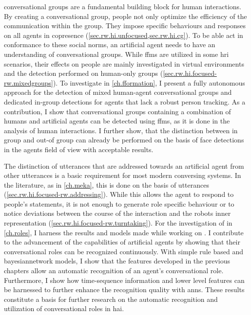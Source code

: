 \Glspl{conversational group} are a fundamental building block for human interactions.
By creating a \gls{conversational group}, people not only optimize the efficiency of the communication within the group.
They impose specific behaviours and responses on all agents in \gls{copresence} (\cref{sec.rw.hi.unfocused,sec.rw.hi.cg}).
To be able act in conformance to these social norms, an \gls{artificial agent} needs to have an understanding of \glspl{conversational group}.
While \glspl{ffm} are utilized in some \gls{hri} scenarios, their effects on people are mainly investigated in virtual environments and the detection performed on human-only groups (\cref{sec.rw.hi.focused-rw.mixedgroups}).
To investigate  in \cref{ch.fformation}, I present a fully autonomous approach for the detection of mixed human-agent \glspl{conversational group} and dedicated in-group detections for agents that lack a robust person tracking.
As a contribution, I show that \glspl{conversational group} containing a combination of humans and \glspl{artificial agent} can be detected using \glspl{ffm}, as it is done in the analysis of human interactions.
I further show, that the distinction between in group and out-of group can already be performed on the basis of face detections in the agents field of view with acceptable results.

The distinction of utterances that are addressed towards an \gls{artificial agent} from other utterances is a basic requirement for most modern conversing systems.
In the literature, as in \cref{ch.meka}, this is done on the basis of utterances (\cref{sec.rw.hi.focused-rw.addressing}).
While this allows the agent to respond to people's statements, it is not enough to generate role specific behaviour or to notice deviations between the course of the interaction and the \glspl{robot} inner representation (\cref{sec.rw.hi.focused-rw.turntaking}).
For the investigation of  in \cref{ch.roles}, I harness the results and models made while working on .
I contribute to the advancement of the capabilities of \glspl{artificial agent} by showing that their \glspl{conversational role} can be recognized continuously.
With simple rule based and \gls{bayesiannetwork} models, I show that the features developed in the previous chapters allow an automatic recognition of an agent's \gls{conversational role}.
Furthermore, I show how time-sequence information and lower level features can be harnessed to further enhance the recognition quality with \glspl{ann}.
These results constitute a basis for further research on the automatic recognition and utilization of \glspl{conversational role} in \gls{hai}.

